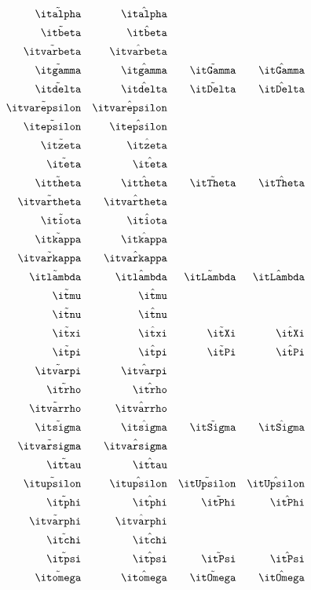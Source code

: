 \begin{align*}
  \tilde{\italpha}    && \hat{\italpha} \\
  \tilde{\itbeta}     && \hat{\itbeta}  \\
  \tilde{\itvarbeta}  && \hat{\itvarbeta}  \\
  \tilde{\itgamma}    && \hat{\itgamma} && \tilde{\itGamma} && \hat{\itGamma} \\
  \tilde{\itdelta}    && \hat{\itdelta} && \tilde{\itDelta} && \hat{\itDelta} \\
  \tilde{\itvarepsilon} &&\hat{\itvarepsilon} \\
  \tilde{\itepsilon}  && \hat{\itepsilon} \\
  \tilde{\itzeta}     && \hat{\itzeta} \\
  \tilde{\iteta}      && \hat{\iteta}  \\
  \tilde{\ittheta}    && \hat{\ittheta} && \tilde{\itTheta} && \hat{\itTheta} \\
  \tilde{\itvartheta} &&\hat{\itvartheta} \\
  \tilde{\itiota}     && \hat{\itiota} \\
  \tilde{\itkappa}    && \hat{\itkappa} \\
  \tilde{\itvarkappa} && \hat{\itvarkappa} \\
  \tilde{\itlambda}   &&\hat{\itlambda} &&\tilde{\itLambda} &&\hat{\itLambda} \\
  \tilde{\itmu}       &&\hat{\itmu} \\
  \tilde{\itnu}       &&\hat{\itnu} \\
  \tilde{\itxi}       &&\hat{\itxi}     &&\tilde{\itXi}     &&\hat{\itXi} \\
  \tilde{\itpi}       &&\hat{\itpi}     &&\tilde{\itPi}     &&\hat{\itPi} \\
  \tilde{\itvarpi}    && \hat{\itvarpi} \\
  \tilde{\itrho}      && \hat{\itrho} \\
  \tilde{\itvarrho}   &&\hat{\itvarrho} \\
  \tilde{\itsigma}    && \hat{\itsigma} && \tilde{\itSigma} && \hat{\itSigma} \\
  \tilde{\itvarsigma} && \hat{\itvarsigma} \\
  \tilde{\ittau}      && \hat{\ittau} \\
  \tilde{\itupsilon}  && \hat{\itupsilon} && \tilde{\itUpsilon} && \hat{\itUpsilon} \\
  \tilde{\itphi}      && \hat{\itphi}   && \tilde{\itPhi} && \hat{\itPhi} \\
  \tilde{\itvarphi}   &&\hat{\itvarphi} \\
  \tilde{\itchi}      && \hat{\itchi} \\
  \tilde{\itpsi}      && \hat{\itpsi}   && \tilde{\itPsi}   && \hat{\itPsi} \\
  \tilde{\itomega}    && \hat{\itomega} && \tilde{\itOmega} && \hat{\itOmega}
\end{align*}

